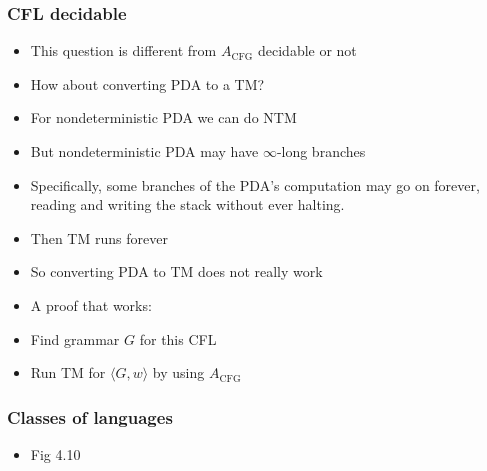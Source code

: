 \begin{frame}[allowframebreaks] \frametitle{CFL decidable}
  \begin{itemize}
\item This question is different from $A_{\text{CFG}}$ decidable
or not
\item How about converting PDA to a TM?
\item For nondeterministic PDA we can do NTM 
\item But nondeterministic PDA may have $\infty$-long branches

\item Specifically,  some
branches of the PDA's computation may go on forever, reading and writing the
stack without ever halting.
\item Then TM runs forever
\item So converting PDA to TM does not really work
\item A proof that works:

\item [] Find grammar $G$ for this CFL
\item [] Run TM for $\langle  G,w\rangle $ by using 
$A_{\text{CFG}}$
\end{itemize}\end{frame}

\begin{frame}[allowframebreaks] \frametitle{Classes of languages}
  \begin{itemize}
  \item Fig 4.10

\begin{center}
    \end{center}
  \end{itemize}\end{frame}



